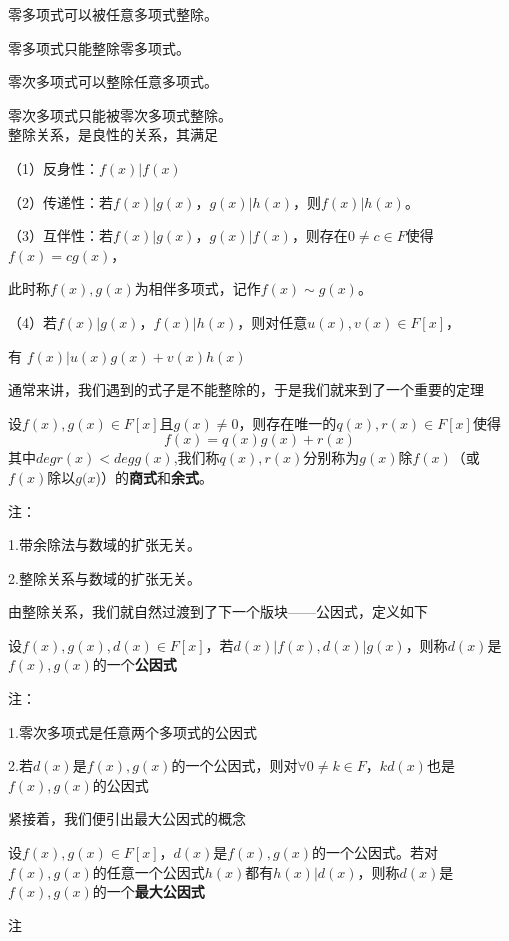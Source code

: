 \documentclass[lang=cn,10pt]{elegantbook}
\begin{document}
零多项式可以被任意多项式整除。

	零多项式只能整除零多项式。
	
	零次多项式可以整除任意多项式。
	
	零次多项式只能被零次多项式整除。
~\\

整除关系，是良性的关系，其满足
\begin{conclusion}
		（1）反身性：$f(x)|f(x)$
		
	（2）传递性：若$f(x)|g(x)$，$g(x)|h(x)$，则$f(x)|h(x)$。
	
	（3）互伴性：若$f(x)|g(x)$，$g(x)|f(x)$，则存在$0\neq c\in F$使得
	$f(x)=cg(x)$，
	
	此时称$f(x),g(x)$为相伴多项式，记作$f(x)\sim g(x)$。
	
	（4）若$f(x)|g(x)$，$f(x)|h(x)$，则对任意$u(x),v(x)\in F[x]$，
	
	有
	$f(x)|u(x)g(x)+v(x)h(x)$
	
\end{conclusion}
通常来讲，我们遇到的式子是不能整除的，于是我们就来到了一个重要的定理
\begin{definition}[带余除法]
	设$f(x),g(x)\in F[x]$且$g(x)\neq0$，则存在唯一的$q(x),r(x)\in F[x]$使得
	\begin{equation*}
		f(x)=q(x)g(x)+r(x)
	\end{equation*}
	其中$deg{r}(x)<deg{g}(x)$,我们称$q(x),r(x)$分别称为$g(x)$除$f(x)$（或$f(x)$除以$g(x$)）的\textbf{商式}和\textbf{余式}。
\end{definition}

注：

	1.带余除法与数域的扩张无关。
	
	2.整除关系与数域的扩张无关。

由整除关系，我们就自然过渡到了下一个版块——公因式，定义如下
\begin{definition}[公因式]
	设$f(x),g(x),d(x)\in F[x]$，若$d(x)|f(x),d(x)|g(x)$，则称$d(x)$是$f(x),g(x)$的一个\textbf{公因式}
\end{definition}
注：

1.零次多项式是任意两个多项式的公因式

2.若$d(x)$是$f(x),g(x)$的一个公因式，则对$\forall0\neq k\in F$，$kd(x)$也是$f(x),g(x)$的公因式

紧接着，我们便引出最大公因式的概念
\begin{definition}[最大公因式]
	设$f(x),g(x)\in F[x]$，$d(x)$是$f(x),g(x)$的一个公因式。若对$f(x),g(x)$的任意一个公因式$h(x)$都有$h(x)|d(x)$，则称$d(x)$是$f(x),g(x)$的一个\textbf{最大公因式}
\end{definition}
注
\end{document}
